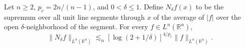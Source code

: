 Let \(n\ge2\), \(p_c=2n/(n-1)\), and \(0<\delta\le1\). Define \(N_\delta f(x)\) to be the supremum over all unit line segments through \(x\) of the average of \(|f|\) over the open \(\delta\)-neighborhood of the segment. For every \(f\in L^n(\mathbb R^n)\),
\[
 \|N_\delta f\|_{L^n(\mathbb R^n)}
 \lesssim_n [\log(2+1/\delta)]^{4/p_c}\|f\|_{L^n(\mathbb R^n)} .
\]
